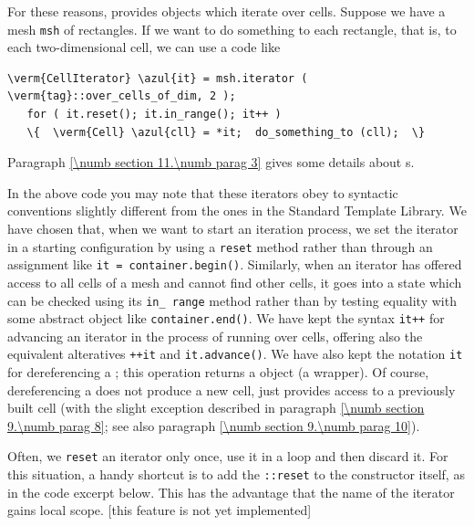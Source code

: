 For these reasons, {\maniFEM} provides objects which iterate over cells.
Suppose we have a mesh {\small\tt msh} of rectangles.
If we want to do something to each rectangle, that is, to each two-dimensional cell,
we can use a code like

\begin{Verbatim}[commandchars=\\\{\},formatcom=\small\tt,
   baselinestretch=0.94,framesep=2mm                      ]
   \verm{CellIterator} \azul{it} = msh.iterator ( \verm{tag}::over_cells_of_dim, 2 );
   for ( it.reset(); it.in_range(); it++ )
   \{  \verm{Cell} \azul{cll} = *it;  do_something_to (cll);  \}
\end{Verbatim}

Paragraph \ref{\numb section 11.\numb parag 3} gives some details about {\small\tt{}}s.

In the above code you may note that these iterators obey to syntactic conventions
slightly different from the ones in the Standard Template Library.
We have chosen that, when we want to start an iteration process, we set the iterator in
a starting configuration by using a {\small\tt reset} method rather than through an assignment
like {\small\tt it = container.begin()}.
Similarly, when an iterator has offered access to all cells of a mesh and cannot find
other cells, it goes into a state which can be checked using its {\small\tt in\_\,range} method
rather than by testing equality with some abstract object like {\small\tt container.end()}.
We have kept the syntax {\small\tt it++} for advancing an iterator in the process of
running over cells, offering also the equivalent alteratives {\small\tt ++it} and
{\small\tt it.advance()}.
We have also kept the notation {\small\tt *it} for dereferencing a
{\small\tt {}};
this operation returns a {\small\tt {}} object (a wrapper).
Of course, dereferencing a {\small\tt {}} does not produce a new cell,
just provides access to a previously built cell
(with the slight exception described in paragraph \ref{\numb section 9.\numb parag 8};
see also paragraph \ref{\numb section 9.\numb parag 10}).

Often, we {\small\tt reset} an iterator only once, use it in a loop and then discard it.
For this situation, a handy shortcut is to add the {\small\tt{}::reset}
to the constructor itself, as in the code excerpt below.
This has the advantage that the name of the iterator gains local scope.
[this feature is not yet implemented]

